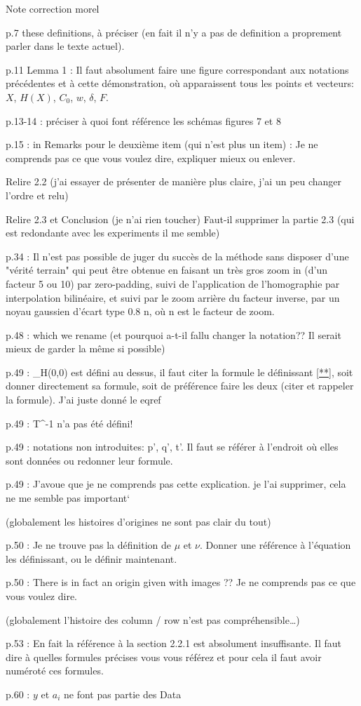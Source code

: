 Note correction morel

p.7 these definitions, à préciser (en fait il n’y a pas de definition a proprement parler dans le texte actuel).

p.11 Lemma 1 :  Il faut absolument faire une figure correspondant aux notations précédentes et à cette démonstration, où apparaissent tous  les points et vecteurs: $X$, $H(X)$, $C_0$, $w$, $\delta$, $F$.

p.13-14 : préciser à quoi font référence les schémas figures 7 et 8

p.15 : in Remarks pour le deuxième item (qui n’est plus un item) :  Je ne comprends pas ce que vous voulez dire, expliquer mieux ou enlever.

Relire 2.2 (j’ai essayer de présenter de manière plus claire, j’ai un peu changer l’ordre et relu)

Relire 2.3 et Conclusion (je n’ai rien toucher) 
Faut-il supprimer la partie 2.3 (qui est redondante avec les experiments il me semble)

p.34 : Il n'est pas possible de juger du succès de la méthode sans disposer d'une "vérité terrain" qui peut être obtenue en faisant un très gros zoom in (d'un facteur 5 ou 10) par zero-padding, suivi de l'application de l'homographie par interpolation bilinéaire, et suivi par le zoom arrière du facteur inverse, par un noyau gaussien d'écart type 0.8 n, où n est  le facteur de zoom.

p.48 : which we rename
(et pourquoi a-t-il fallu changer la notation?? Il serait mieux de garder la même si possible)

p.49 : \Delta_H(0,0) est défini au dessus, il faut citer la formule le définissant \eqref{**}, soit donner directement sa formule, soit de préférence faire les deux (citer et rappeler la formule). 
J’ai juste donné le eqref

p.49 : T^{-1} n'a pas été défini!

p.49 : notations non introduites: p', q', t'. Il faut se référer à l'endroit où elles sont données ou redonner leur formule.

p.49 : J'avoue que je ne comprends pas cette explication. 
je l’ai supprimer, cela ne me semble pas important`

(globalement les histoires d’origines ne sont pas clair du tout)

p.50 : Je ne trouve pas la définition de $\mu$ et $\nu$. Donner une référence à l'équation les définissant, ou le définir maintenant.

p.50 : There is in fact an origin given with images ?? Je ne comprends pas ce que vous voulez dire.

(globalement l’histoire des column / row n’est pas compréhensible…)

p.53 : En fait la référence à la section 2.2.1 est absolument insuffisante. Il faut dire à quelles formules précises vous vous référez et pour cela il faut avoir numéroté ces formules.

p.60 : $y$ et $a_i$ ne font pas partie des Data
